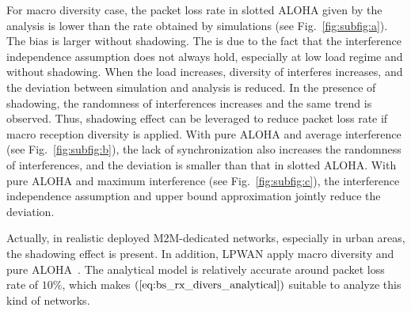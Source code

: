 For macro diversity case, the packet loss rate in slotted ALOHA given by the analysis is lower than the rate obtained by simulations (see Fig.~\ref{fig:subfig:a}). The bias is larger without shadowing. The is due to the fact that the interference independence assumption does not always hold, especially at low load regime and without shadowing. When the load increases, diversity of interferes increases, and the deviation between simulation and analysis is reduced. In the presence of shadowing, the randomness of interferences increases and the same trend is observed. Thus, shadowing effect can be leveraged to reduce packet loss rate if macro reception diversity is applied. With pure ALOHA and average interference (see Fig.~\ref{fig:subfig:b}), the lack of synchronization also increases the randomness of interferences, and the deviation is smaller than that in slotted ALOHA. With pure ALOHA and maximum interference (see Fig.~\ref{fig:subfig:c}), the interference independence assumption and upper bound approximation jointly reduce the deviation.

Actually, in realistic deployed M2M-dedicated networks, especially in urban areas, the shadowing effect is present. In addition, LPWAN apply macro diversity and pure ALOHA~\cite{ietf-lpwan-overview-03}. The analytical model is relatively accurate around packet loss rate of $10\%$, which makes $(\ref{eq:bs_rx_divers_analytical})$ suitable to analyze this kind of networks.

